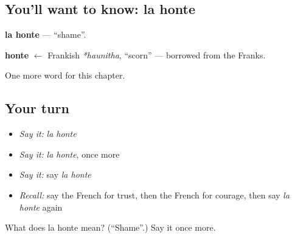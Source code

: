 \subsection*{You'll want to know: la honte}
\textbf{la honte} — \textquotedblleft{}shame\textquotedblright{}.

\begin{cousinweb}
\textbf{honte} $\leftarrow$ Frankish \emph{*haunitha}, \textquotedblleft{}scorn\textquotedblright{} — borrowed from the Franks.
\end{cousinweb}

\begin{grammarlens}[title={What you've built}]
One more word for this chapter.
\end{grammarlens}

\subsection*{Your turn}
\begin{itemize}
\raggedright
  \item \emph{Say it:} \emph{la honte}
  \item \emph{Say it:} \emph{la honte}, once more
  \item \emph{Say it:} say \emph{la honte}
  \item \emph{Recall:} say the French for trust, then the French for courage, then say \emph{la honte} again
\end{itemize}

\begin{tcolorbox}[breakable,colback=teal!4,colframe=teal!35!black,title={Before you move on}]
What does la honte mean? (\textquotedblleft{}Shame\textquotedblright{}.) Say it once more.
\end{tcolorbox}
